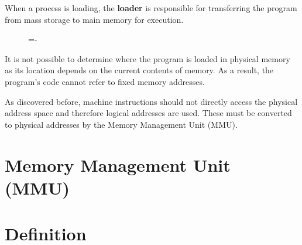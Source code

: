 \documentclass[a4paper]{systems-software}
\begin{document}
When a process is loading, the \textbf{loader} is responsible for transferring the program from mass storage to main memory for execution.

\begin{figure}[H]
  \lineskip=-\fboxrule
\end{figure}

It is not possible to determine where the program is loaded in physical memory as its location depends on the current contents of memory. As a result, the program's code cannot refer to fixed memory addresses.

As discovered before, machine instructions should not directly access the physical address space and therefore logical addresses are used. These must be converted to physical addresses by the Memory Management Unit (MMU).


\section{Memory Management Unit (MMU)}

\section*{Definition}
\end{document}
